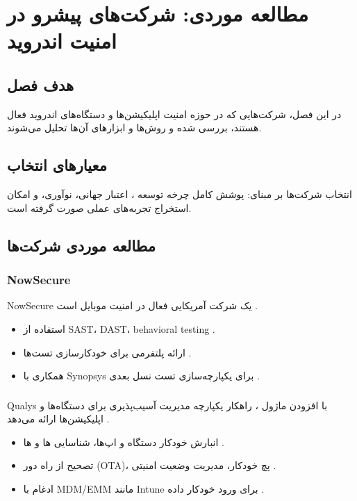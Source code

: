 \clearpage
\thispagestyle{empty}

\chapter{مطالعه موردی: شرکت‌های پیشرو در امنیت اندروید}\label{chap3}

\section{هدف فصل}
در این فصل، شرکت‌هایی که در حوزه امنیت اپلیکیشن‌ها و دستگاه‌های اندروید فعال هستند، بررسی شده و روش‌ها و ابزارهای آن‌ها تحلیل می‌شوند.

\section{معیارهای انتخاب}
انتخاب شرکت‌ها بر مبنای: پوشش کامل چرخه توسعه ، اعتبار جهانی، نوآوری، و امکان استخراج تجربه‌های عملی صورت گرفته است.

\section{مطالعه موردی شرکت‌ها}

\subsection{NowSecure}
NowSecure یک شرکت آمریکایی فعال در امنیت موبایل است \cite{nowsecure2024}.
\begin{itemize}
  \item استفاده از SAST، DAST، behavioral testing \cite{nowsecure2024platform}.
  \item ارائه پلتفرمی برای خودکارسازی تست‌ها  \cite{nowsecure2024automation}.
  \item همکاری با Synopsys برای یکپارچه‌سازی تست نسل بعدی \cite{nowsecure2024synopsys}.
\end{itemize}

\subsection{}
Qualys با افزودن ماژول ، راهکار یکپارچه مدیریت آسیب‌پذیری برای دستگاه‌ها و اپلیکیشن‌ها ارائه می‌دهد \cite{qualys2024vmdr}.
\begin{itemize}
  \item انبارش خودکار دستگاه و اپ‌ها، شناسایی ها و ها \cite{qualys2024inventory}.
  \item تصحیح از راه دور (OTA)، پچ خودکار، مدیریت وضعیت امنیتی \cite{qualys2024patching}.
  \item ادغام با MDM/EMM مانند Intune برای ورود خودکار داده \cite{qualys2024mdm}.
\end{itemize}

